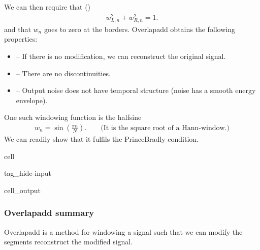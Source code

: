 \documentclass[letterpaper,10pt,english]{jupyterBook}
\begin{document}
\sphinxAtStartPar
We can then require that ()
\begin{equation*}
\begin{split}  
\boxed{w^2_{L,n} + w^2_{R,n} = 1}. 
\end{split}
\end{equation*}
\sphinxAtStartPar
and that \(w_n\) goes to zero at the borders.
Overlap\sphinxhyphen{}add obtains the following properties:
\begin{itemize}
\item {} 
\sphinxAtStartPar
{} – If there is no modification, we can reconstruct the original signal.

\item {} 
\sphinxAtStartPar
{} – There are no discontinuities.

\item {} 
\sphinxAtStartPar
{} – Output noise does not have temporal   structure (noise has a smooth energy envelope).

\end{itemize}

\sphinxAtStartPar
One such windowing function is the half\sphinxhyphen{}sine
\begin{equation*}
\begin{split}  
w_n = \sin\left(\frac{\pi n}{N}\right).\qquad\text{(It is the square root of a Hann-window.)}
\end{split}
\end{equation*}
\sphinxAtStartPar
We can readily show that it fulfils the    Prince\sphinxhyphen{}Bradly condition.

\begin{sphinxuseclass}{cell}
\begin{sphinxuseclass}{tag_hide-input}\begin{sphinxVerbatimOutput}

\begin{sphinxuseclass}{cell_output}
\noindent{}

\end{sphinxuseclass}\end{sphinxVerbatimOutput}

\end{sphinxuseclass}
\end{sphinxuseclass}

\subsubsection{Overlap\sphinxhyphen{}add summary}
\label{\detokenize{Representations/Short-time_processing:overlap-add-summary}}
\sphinxAtStartPar
Overlap\sphinxhyphen{}add is a method for windowing a signal such that we can modify the segments  reconstruct the modified signal.
\end{document}
